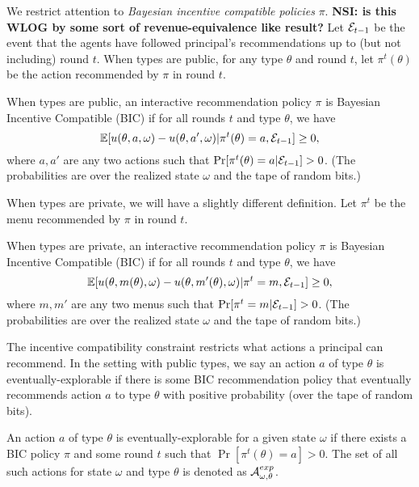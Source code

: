 We restrict attention to {\em Bayesian incentive compatible policies} $\pi$. 
{\bf NSI: is this WLOG by some sort of revenue-equivalence like result?} 
Let $\mathcal{E}_{t-1}$ be the event that the agents have followed principal's recommendations up to (but not including) round $t$. When types are public, for any type $\theta$ and round $t$, let $\pi^t(\theta)$ be the action recommended by $\pi$ in round $t$.

\begin{definition}
When types are public, an interactive recommendation policy $\pi$ is Bayesian Incentive Compatible (BIC) if for all rounds $t$ and type $\theta$, we have
\[
\mathbb{E}[ u(\theta,a,\omega) - u(\theta,a',\omega)| \pi^t(\theta) =a, \mathcal{E}_{t-1}] \geq 0,
\]
where $a,a'$ are any two actions such that $\Pr[\pi^t(\theta) = a|\mathcal{E}_{t-1}] > 0$. (The probabilities are over the realized state $\omega$ and the tape of random bits.)
\end{definition}

When types are private, we will have a slightly different definition. Let $\pi^t$ be the menu recommended by $\pi$  in round $t$.

\begin{definition}
\label{def:bic_private}
When types are private, an interactive recommendation policy $\pi$ is Bayesian Incentive Compatible (BIC) if for all rounds $t$ and type $\theta$, we have
\[
\mathbb{E}[ u(\theta,m(\theta),\omega) - u(\theta,m'(\theta),\omega)| \pi^t = m, \mathcal{E}_{t-1}] \geq 0,
\]
where $m,m'$ are any two menus such that $\Pr[\pi^t= m|\mathcal{E}_{t-1}] > 0$. (The probabilities are over the realized state $\omega$ and the tape of random bits.)
\end{definition}

The incentive compatibility constraint restricts what actions a principal can recommend.  In the setting with public types, we say an action $a$ of type $\theta$ is eventually-explorable if there is some BIC recommendation policy that eventually recommends action $a$ to type $\theta$ with positive probability (over the tape of random bits).

\begin{definition}
An action $a$ of type $\theta$ is eventually-explorable for a given state $\omega$ if there exists a BIC policy $\pi$ and some round $t$ such that $\Pr[\pi^t(\theta)=a]>0$.  The set of all such actions for state $\omega$ and type $\theta$ is denoted as $\mathcal{A}_{\omega,\theta}^{exp}$.
\end{definition}

